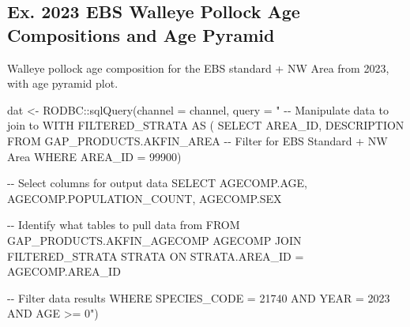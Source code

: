 \documentclass[
  letterpaper,
  oneside,
  open=any]{scrbook}
\newenvironment{Shaded}{\begin{snugshade}}{\end{snugshade}}
\newcommand{\AttributeTok}[1]{\textcolor[rgb]{0.40,0.45,0.13}{#1}}
\newcommand{\FunctionTok}[1]{\textcolor[rgb]{0.28,0.35,0.67}{#1}}
\newcommand{\NormalTok}[1]{\textcolor[rgb]{0.00,0.23,0.31}{#1}}
\newcommand{\OtherTok}[1]{\textcolor[rgb]{0.00,0.23,0.31}{#1}}
\newcommand{\SpecialCharTok}[1]{\textcolor[rgb]{0.37,0.37,0.37}{#1}}
\newcommand{\StringTok}[1]{\textcolor[rgb]{0.13,0.47,0.30}{#1}}
\begin{document}
\subsection{Ex. 2023 EBS Walleye Pollock Age Compositions and Age
Pyramid}\label{ex.-2023-ebs-walleye-pollock-age-compositions-and-age-pyramid}

Walleye pollock age composition for the EBS standard + NW Area from
2023, with age pyramid plot.

\begin{Shaded}
\begin{Highlighting}[]
\NormalTok{dat }\OtherTok{\textless{}{-}}\NormalTok{ RODBC}\SpecialCharTok{::}\FunctionTok{sqlQuery}\NormalTok{(}\AttributeTok{channel =}\NormalTok{ channel, }
                       \AttributeTok{query =} \StringTok{"}
\StringTok{{-}{-} Manipulate data to join to}
\StringTok{WITH FILTERED\_STRATA AS (}
\StringTok{SELECT }
\StringTok{AREA\_ID, }
\StringTok{DESCRIPTION }
\StringTok{FROM GAP\_PRODUCTS.AKFIN\_AREA}
\StringTok{{-}{-} Filter for EBS Standard + NW Area }
\StringTok{WHERE AREA\_ID = 99900)}

\StringTok{{-}{-} Select columns for output data}
\StringTok{SELECT }
\StringTok{AGECOMP.AGE, }
\StringTok{AGECOMP.POPULATION\_COUNT, }
\StringTok{AGECOMP.SEX}

\StringTok{{-}{-} Identify what tables to pull data from}
\StringTok{FROM GAP\_PRODUCTS.AKFIN\_AGECOMP AGECOMP}
\StringTok{JOIN FILTERED\_STRATA STRATA }
\StringTok{ON STRATA.AREA\_ID = AGECOMP.AREA\_ID}

\StringTok{{-}{-} Filter data results}
\StringTok{WHERE SPECIES\_CODE = 21740}
\StringTok{AND YEAR = 2023}
\StringTok{AND AGE \textgreater{}= 0"}\NormalTok{)}
\end{Highlighting}
\end{Shaded}
\end{document}

